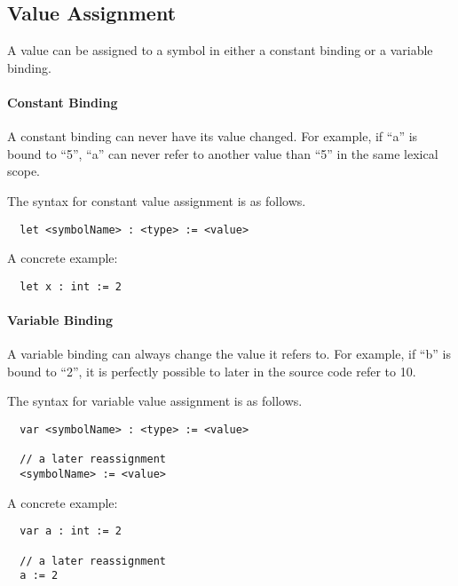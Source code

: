 \subsection{Value Assignment}
\label{subsec:value_assignment}

A value can be assigned to a symbol in either a constant binding or a variable binding. 

\paragraph{Constant Binding}

A constant binding can never have its value changed. For example, if \enquote{a} is bound to \enquote{5}, \enquote{a} can never refer to another value than \enquote{5} in the same lexical scope.

The syntax for constant value assignment is as follows.
\begin{verbatim}
  let <symbolName> : <type> := <value>
\end{verbatim}

A concrete example:

\begin{verbatim}
  let x : int := 2
\end{verbatim}

\paragraph{Variable Binding}

A variable binding can always change the value it refers to. For example, if \enquote{b} is bound to \enquote{2}, it is perfectly possible to later in the source code refer to {10}.

The syntax for variable value assignment is as follows.
\begin{verbatim}
  var <symbolName> : <type> := <value>

  // a later reassignment
  <symbolName> := <value>
\end{verbatim}

A concrete example:

\begin{verbatim}
  var a : int := 2
  
  // a later reassignment
  a := 2
\end{verbatim}
